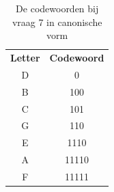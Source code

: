 \documentclass[]{article}
\begin{document}
\begin{section}
\begin{subsection}
        \begin{table}
            \centering
            \begin{tabular}{c|c}
            \textbf{Letter} &
            \textbf{Codewoord} \\
            D & 0 \\
            B & 100 \\
            C & 101 \\
            G & 110 \\
            E & 1110 \\
            A & 11110 \\
            F & 11111 \\
            \end{tabular}
            \caption{De codewoorden bij vraag 7 in canonische vorm}
            \label{tab:canonical_codes}
        \end{table}

    \end{subsection}

\end{section}
\newpage
\end{document}
